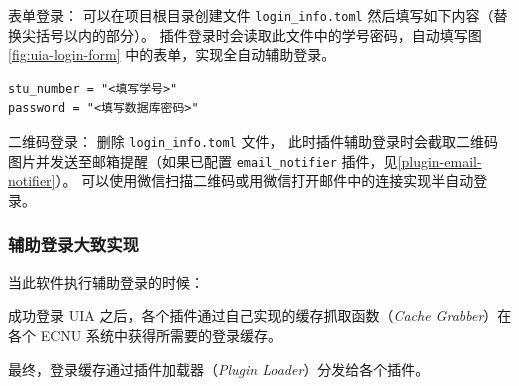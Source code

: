 \begin{rmr}[切换表单登录和二维码登录]
    \quad 表单登录：
    可以在项目根目录创建文件 \verb`login_info.toml`
    然后填写如下内容（替换尖括号以内的部分）。
    插件登录时会读取此文件中的学号密码，自动填写图\ref{fig:uia-login-form} 中的表单，实现全自动辅助登录。
    \begin{verbatim}
stu_number = "<填写学号>"
password = "<填写数据库密码>" \end{verbatim}

    \quad 二维码登录：
    删除 \verb`login_info.toml` 文件，
    此时插件辅助登录时会截取二维码图片并发送至邮箱提醒（如果已配置 \verb`email_notifier` 插件，见\ref{plugin-email-notifier}）。 %
    可以使用微信扫描二维码或用微信打开邮件中的连接实现半自动登录。
\end{rmr}

\subsubsection{辅助登录大致实现}

当此软件执行辅助登录的时候：


成功登录 UIA 之后，各个插件通过自己实现的缓存抓取函数（\textit{Cache Grabber}）在各个 ECNU 系统中获得所需要的登录缓存。

最终，登录缓存通过插件加载器（\textit{Plugin Loader}）分发给各个插件。